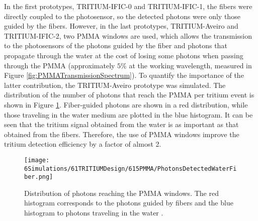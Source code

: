 In the first prototypes, TRITIUM-IFIC-0 and TRITIUM-IFIC-1, the fibers were directly coupled to the photosensor, so the detected photons were only those guided by the fibers. However, in the last prototypes, TRITIUM-Aveiro and TRITIUM-IFIC-2, two PMMA windows are used, which allows the transmission to the photosensors of the photons guided by the fiber and photons that propagate through the water at the cost of losing some photons when passing through the PMMA (approximately $5\%$ at the working wavelength, measured in Figure \ref{fig:PMMATransmissionSpectrum}). To quantify the importance of the latter contribution, the TRITIUM-Aveiro prototype was simulated. The distribution of the number of photons that reach the PMMA per tritium event is shown in Figure \ref{fig:PMMAEffect}. Fiber-guided photons are shown in a red distribution, while those traveling in the water medium are plotted in the blue histogram. It can be seen that the tritium signal obtained from the water is as important as that obtained from the fibers. Therefore, the use of PMMA windows improve the tritium detection efficiency by a factor of almost 2.

\begin{figure}[hbtp]
\centering
\texttt{[image: 6Simulations/61TRITIUMDesign/615PMMA/PhotonsDetectedWaterFiber.png]}
\caption{Distribution of photons reaching the PMMA windows. The red histogram corresponds to the photons guided by fibers and the blue histogram to photons traveling in the water \cite{SimulationPaperCarlos}.\label{fig:PMMAEffect}}
\end{figure}

